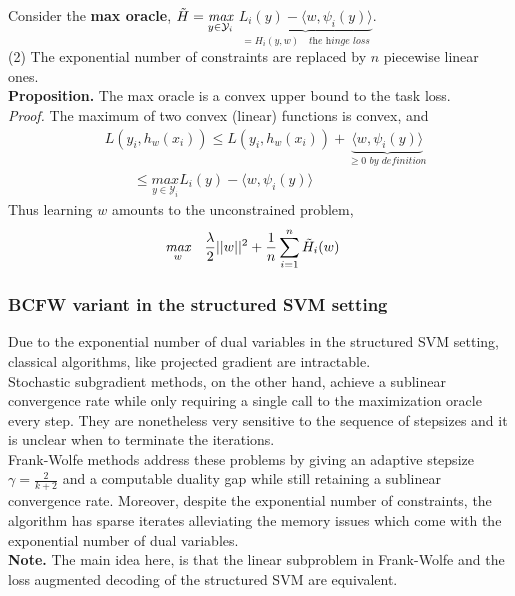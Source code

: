 Consider the \textbf{max oracle}, $\Tilde{H}=
\underset{y\in\mathcal{Y}_{i}}{\textit{max}}$ $\underbrace{L_{i}(y)- \langle w,
\psi_{i}(y)\rangle}_{= H_{i}(y,w)\quad\textit{the hinge loss}}$.\\ (2) The
exponential number of constraints are replaced by $n$ piecewise linear ones. \\

\textbf{Proposition.} The max oracle is a convex upper bound to the task loss.\\
\textit{Proof.} The maximum of two convex (linear) functions is convex, and
\begin{equation*}
\begin{aligned}
    &L(y_{i},h_{w}(x_{i})) \leq L(y_{i},h_{w}(x_{i})) + \underbrace{\langle w, \psi_{i}(y)\rangle}_{\geq 0 \textit{ by definition}} \\
    &\quad\quad\leq \underset{y\in\mathcal{Y}_{i}}{\textit{max}} L_{i}(y)- \langle w, \psi_{i}(y)\rangle
\end{aligned}
\end{equation*}
Thus learning $w$ amounts to the unconstrained problem,
\begin{equation*}
\begin{aligned}
    &\underset{w}{\textit{max}}\quad\frac{\lambda}{2}||w||^{2}+ \frac{1}{n}\sum_{i=1}^{n}\Tilde{H}_{i}(w)
\end{aligned}
\end{equation*}
\subsubsection{BCFW variant in the structured SVM setting}
Due to the exponential number of dual variables in the structured SVM setting,
classical algorithms, like projected gradient are intractable. \\
Stochastic subgradient methods, on the other hand, achieve a sublinear
convergence rate while only requiring a single call to the maximization oracle
every step. They are nonetheless very sensitive to the sequence of stepsizes and
it is unclear when to terminate the iterations. \\

Frank-Wolfe methods address these problems by giving an adaptive stepsize
$\gamma= \frac{2}{k+2}$ and a computable duality gap while still retaining a
sublinear convergence rate. Moreover, despite the exponential number of
constraints, the algorithm has sparse iterates alleviating the memory issues
which come with the exponential number of dual variables.\\
\textbf{Note.} The main idea here, is that the linear subproblem in Frank-Wolfe
and the loss augmented decoding of the structured SVM are equivalent. \\

